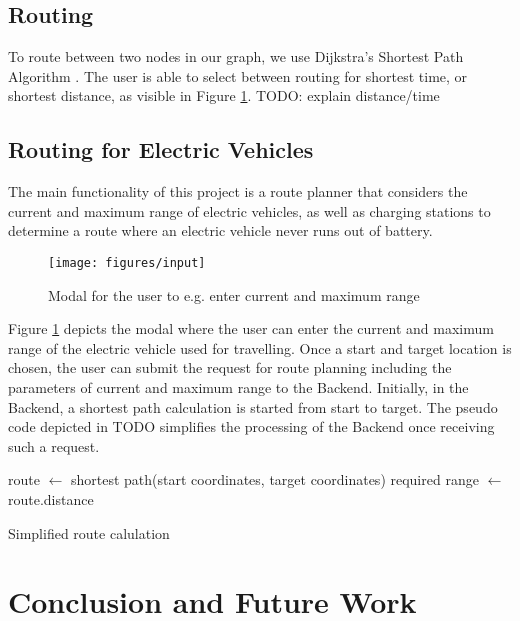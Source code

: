 \documentclass[a4paper]{article}
\begin{document}
\subsection{Routing}
To route between two nodes in our graph, we use Dijkstra's Shortest Path Algorithm \cite{Dijkstra1959}.
The user is able to select between routing for shortest time, or shortest distance, as visible in Figure \ref{fig:input}.
TODO: explain distance/time
\subsection{Routing for Electric Vehicles}
The main functionality of this project is a route planner that considers the current and maximum range of electric vehicles, as well as charging stations to determine a route where an electric vehicle never runs out of battery.
\begin{figure}[h]
    \centering
    \texttt{[image: figures/input]}
    \caption{Modal for the user to e.g. enter current and maximum range}
    \label{fig:input}
\end{figure}
Figure \ref{fig:input} depicts the modal where the user can enter the current and maximum range of the electric vehicle used for travelling.
Once a start and target location is chosen, the user can submit the request for route planning including the parameters of current and maximum range to the Backend.
Initially, in the Backend, a shortest path calculation is started from start to target.
The pseudo code depicted in TODO simplifies the processing of the Backend once receiving such a request.\\

\begin{algorithm}[H]
route $\leftarrow$  shortest path(start coordinates, target coordinates)\;
required range $\leftarrow$ route.distance\;
 \caption{Simplified route calulation}
\end{algorithm}
\section{Conclusion and Future Work}


\end{document}
